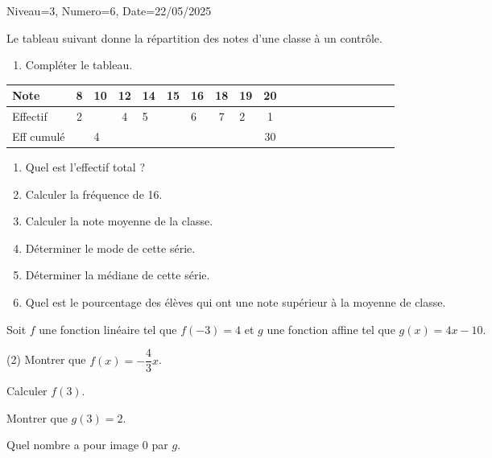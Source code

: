 \documentclass[12pt]{article}
\begin{document}
\begin{Maquette}[DS]{Niveau=3, Numero=6, Date=22/05/2025}
\begin{exercice}[BaremeDetaille=true]
\begin{minipage}{.42\linewidth}
Le tableau suivant donne la répartition des notes d'une classe à un contrôle.
\begin{enumerate}
\item{} Compléter le tableau.
 \end{enumerate}
 \end{minipage}%
 \begin{minipage}{.58\linewidth}
\begin{tabular}{|Oc|Oc|Oc|Oc|Oc|Oc|Oc|Oc|Oc|Oc|}
\hline 
Note & 8 & 10 & 12 & 14 & 15 & 16 & 18 & 19 & 20 \\ 
\hline 
Effectif & 2 &  & 4 & 5 &  & 6 & 7 & 2 & 1 \\ 
\hline 
Eff cumulé &  & 4 &  &  &  &  &  &  & 30 \\ 
\hline 
\end{tabular} 
\end{minipage}%
\begin{enumerate}[start=2]
\item{} Quel est l'effectif total ?
 \anserline[1]
\item{} Calculer la fréquence   de 16.\anserline[1]
\item{} Calculer la note moyenne de la classe.\anserline[2]
\item{} Déterminer le mode de cette série.\anserline[1]
\item{} Déterminer la médiane de cette série.\anserline[1]
\item{} Quel est le pourcentage des élèves qui ont une note supérieur à la moyenne de classe.\par\anserline[1]
\end{enumerate}
\end{exercice}

\begin{exercice}[BaremeDetaille=true]
Soit $f$ une fonction linéaire tel que $f(-3)=4$ et $g$ une fonction affine tel que $g(x)=4x-10$.
\begin{tasks}[label=\arabic*.](2)
\task{} Montrer que $f(x)=-\dfrac{4}{3}x$.
\par\anserline[4]
\task{} Calculer $f(3)$.\par\anserline[4]
\task{}  Montrer que $g(3)=2$.
\par\anserline[4]
\task{} Quel nombre a pour image 0 par $g$.\par\anserline[4]
\end{tasks}
\end{exercice}


\end{Maquette}
\end{document}
